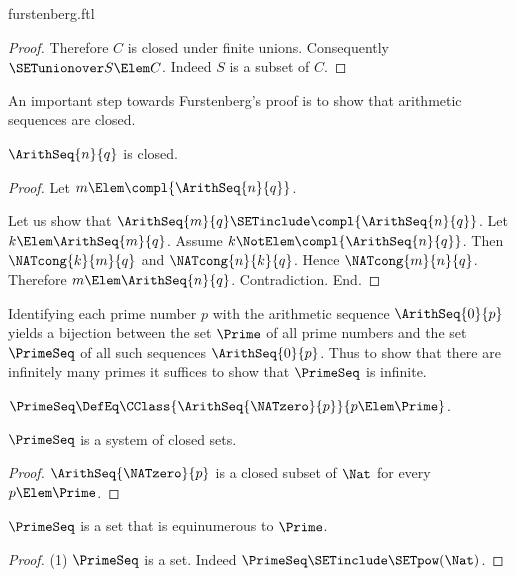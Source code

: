 \documentclass{stex}
\begin{document}
\begin{smodule}{furstenberg.ftl}
\begin{forthel}
\begin{proof}
    Therefore $C$ is closed under finite unions.
    Consequently $\SETunionover S \Elem C$.
    Indeed $S$ is a subset of $C$.
  \end{proof}
\end{forthel}

An important step towards Furstenberg's proof is to show that arithmetic
sequences are closed.

\begin{forthel}
  \begin{lemma}
    $\ArithSeq{n}{q}$ is closed.
  \end{lemma}
  \begin{proof}
    Let $m \Elem \compl{\ArithSeq{n}{q}}$.

    Let us show that $\ArithSeq{m}{q} \SETinclude \compl{\ArithSeq{n}{q}}$.
      Let $k \Elem \ArithSeq{m}{q}$.
      Assume $k \NotElem \compl{\ArithSeq{n}{q}}$.
      Then $\NATcong{k}{m}{q}$ and $\NATcong{n}{k}{q}$.
      Hence $\NATcong{m}{n}{q}$.
      Therefore $m \Elem \ArithSeq{n}{q}$.
      Contradiction.
    End.
  \end{proof}
\end{forthel}

Identifying each prime number $p$ with the arithmetic sequence $\ArithSeq{0}{p}$
yields a bijection between the set $\Prime$ of all prime numbers and the set
$\PrimeSeq$ of all such sequences $\ArithSeq{0}{p}$.
Thus to show that there are infinitely many primes it suffices to show that
$\PrimeSeq$ is infinite.

\begin{forthel}
  \begin{definition}[for=PrimeSeq]
    $\PrimeSeq \DefEq \CClass{\ArithSeq{\NATzero}{p}}{p \Elem \Prime}$.
  \end{definition}

  \begin{lemma}
    $\PrimeSeq$ is a system of closed sets.
  \end{lemma}
  \begin{proof}
    $\ArithSeq{\NATzero}{p}$ is a closed subset of $\Nat$ for every $p \Elem \Prime$.
  \end{proof}

  \begin{lemma}
    $\PrimeSeq$ is a set that is equinumerous to $\Prime$.
  \end{lemma}
  \begin{proof}
    (1) $\PrimeSeq$ is a set.
    Indeed $\PrimeSeq \SETinclude \SETpow(\Nat)$.


\end{proof}
\end{forthel}
\end{smodule}
\end{document}
